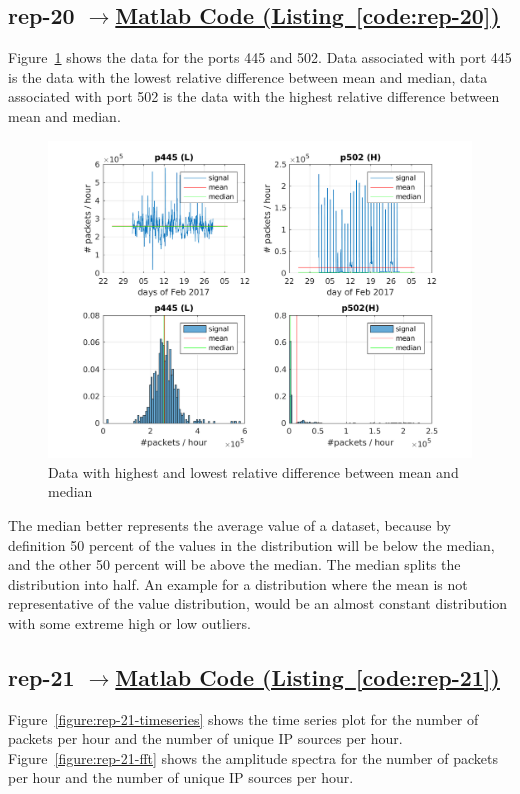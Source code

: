 \documentclass{article}
\newcommand{\codelink}[1]{%
    \hyperref[#1]{\quad$\rightarrow$\enskip Matlab Code (Listing~\ref{#1})}%
}
\begin{document}
\subsection{rep-20 \codelink{code:rep-20}}
Figure~\ref{figure:rep-20} shows the data for the ports 445 and 502. Data associated with port 445 is
the data with the lowest relative difference between mean and median, data associated with port 502 is
the data with the highest relative difference between mean and median.

\begin{figure}[h]
    \centering
    \includegraphics[width=\textwidth]{../exercise-3/plots/rep_20.png}
    \caption{\label{figure:rep-20} Data with highest and lowest relative difference between mean and median}
\end{figure}


The median better represents the average value of a dataset, because by definition 50 percent of the values in
the distribution will be below the median, and the other 50 percent will be above the median. The median splits the
distribution into half.
An example for a distribution where the mean is not representative of the value distribution, would be an almost
constant distribution with some extreme high or low outliers.

\subsection{rep-21 \codelink{code:rep-21}}

Figure~\ref{figure:rep-21-timeseries} shows the time series plot for the number of packets per hour and the
number of unique IP sources per hour.
Figure~\ref{figure:rep-21-fft} shows the amplitude spectra for the number of packets per hour and the
number of unique IP sources per hour.
\end{document}
